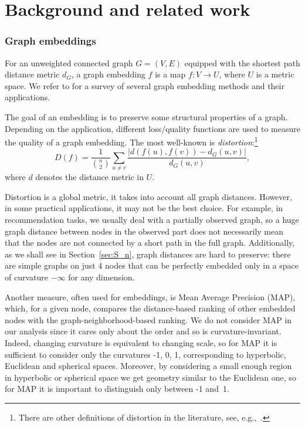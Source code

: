 \documentclass[runningheads]{llncs}
\begin{document}
\section{Background and related work}\label{sec:related_work}

\subsubsection{Graph embeddings} 
For an unweighted connected graph $G = (V,E)$ equipped with the shortest path distance metric $d_G$, a graph embedding $f$ is a map $f: V \rightarrow U$, where $U$ is a metric space. We refer to \cite{goyal2018graph} for a survey of several graph embedding methods and their applications. 

The goal of an embedding is to preserve some structural properties of a graph.
Depending on the application, different loss/quality functions are used to measure the quality of a graph embedding. The most well-known is \textit{distortion}:\footnote{There are other definitions of distortion in the literature, see, e.g.,~\cite{sala2018representation}.}
\[
D(f) = \frac{1}{{n \choose 2}} \sum_{u \neq v}  \frac{|d(f(u),f(v)) - d_G(u,v)|}{d_G(u,v)},
\]
where $d$ denotes the distance metric in $U$.

Distortion is a global metric, it takes into account all graph distances. However, in some practical applications, it may not be the best choice. For example, in recommendation tasks, we usually deal with a partially observed graph, so a huge graph distance between nodes in the observed part does not necessarily mean that the nodes are not connected by a short path in the full graph. Additionally, as we shall see in Section~\ref{sec:S_n}, graph distances are hard to preserve: there are simple graphs on just 4 nodes that can be perfectly embedded only in a space of curvature $-\infty$ for any dimension.

Another measure, often used for embeddings, is Mean Average Precision (MAP), which, for a given node, compares the distance-based ranking of other embedded nodes with the graph-neighborhood-based ranking. 
We do not consider MAP in our analysis since it cares only about the order and so is curvature-invariant.  
Indeed, changing curvature is equivalent to changing scale, so for MAP it is sufficient to consider only the curvatures -1, 0, 1, corresponding to hyperbolic, Euclidean and spherical spaces. Moreover, by considering a small enough region in hyperbolic or spherical space we get geometry similar to the Euclidean one, so for MAP it is important to distinguish only between -1 and~1.
\end{document}
